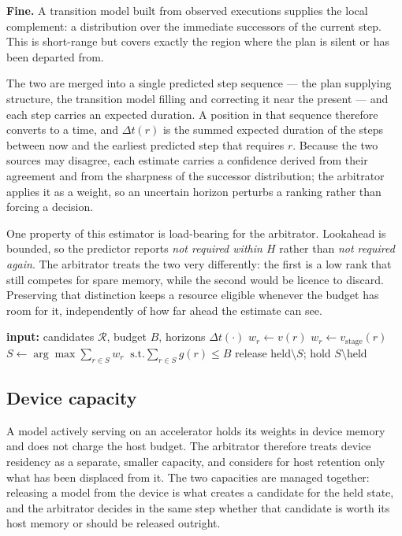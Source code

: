 \documentclass[10pt,twocolumn]{article}
\begin{document}
\textbf{Fine.} A transition model built from observed executions supplies the
local complement: a distribution over the immediate successors of the current
step. This is short-range but covers exactly the region where the plan is
silent or has been departed from.

The two are merged into a single predicted step sequence --- the plan
supplying structure, the transition model filling and correcting it near the
present --- and each step carries an expected duration. A position in that
sequence therefore converts to a time, and $\Delta t(r)$ is the summed
expected duration of the steps between now and the earliest predicted step
that requires $r$. Because the two sources may disagree, each estimate
carries a confidence derived from their agreement and from the sharpness of
the successor distribution; the arbitrator applies it as a weight, so an
uncertain horizon perturbs a ranking rather than forcing a decision.

One property of this estimator is load-bearing for the arbitrator. Lookahead
is bounded, so the predictor reports \emph{not required within $H$} rather
than \emph{not required again}. The arbitrator treats the two very
differently: the first is a low rank that still competes for spare memory,
while the second would be licence to discard. Preserving that distinction
keeps a resource eligible whenever the budget has room for it, independently
of how far ahead the estimate can see.

\begin{algorithm}[t]
\small
\caption{Residency decision}
\label{alg:arb}
\begin{algorithmic}[1]
\State \textbf{input:} candidates $\mathcal{R}$, budget $B$, horizons $\Delta t(\cdot)$
  \State $w_r \gets v(r)$ 
\EndFor
{}
  \State $w_r \gets v_{\text{stage}}(r)$ 
\EndFor
\State $S \gets \arg\max \sum_{r \in S} w_r \;\; \text{s.t.} \sum_{r \in S} g(r) \le B$
\State release $\mathrm{held} \setminus S$; hold $S \setminus \mathrm{held}$
\end{algorithmic}
\end{algorithm}

\subsection{Device capacity}

A model actively serving on an accelerator holds its weights in device
memory and does not charge the host budget. The arbitrator therefore treats
device residency as a separate, smaller capacity, and considers for host
retention only what has been displaced from it. The two capacities are
managed together: releasing a model from the device is what creates a
candidate for the held state, and the arbitrator decides in the same step
whether that candidate is worth its host memory or should be released
outright.
\end{document}
